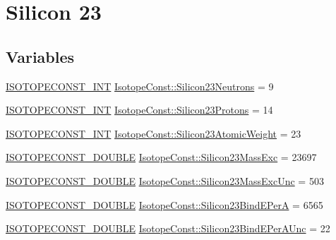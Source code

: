 \hypertarget{group___isotope_const-_silicon-_si23}{}\section{Silicon 23}
\label{group___isotope_const-_silicon-_si23}
\subsection*{Variables}
\begin{DoxyCompactItemize}
\item 
\mbox{\hyperlink{group___isotope_const-_macros_ga5f18360b3e99483a35c32d789e62621c}{I\+S\+O\+T\+O\+P\+E\+C\+O\+N\+S\+T\+\_\+\+I\+NT}} \mbox{\hyperlink{group___isotope_const-_silicon-_si23_ga26b4b927d730735480f5ef62586975b8}{Isotope\+Const\+::\+Silicon23\+Neutrons}} = 9
\item 
\mbox{\hyperlink{group___isotope_const-_macros_ga5f18360b3e99483a35c32d789e62621c}{I\+S\+O\+T\+O\+P\+E\+C\+O\+N\+S\+T\+\_\+\+I\+NT}} \mbox{\hyperlink{group___isotope_const-_silicon-_si23_gaffadb4fe268526d1d59450e08e28ee2a}{Isotope\+Const\+::\+Silicon23\+Protons}} = 14
\item 
\mbox{\hyperlink{group___isotope_const-_macros_ga5f18360b3e99483a35c32d789e62621c}{I\+S\+O\+T\+O\+P\+E\+C\+O\+N\+S\+T\+\_\+\+I\+NT}} \mbox{\hyperlink{group___isotope_const-_silicon-_si23_ga19ae890d696ade27c3ceb5f7e57a2c75}{Isotope\+Const\+::\+Silicon23\+Atomic\+Weight}} = 23
\item 
\mbox{\hyperlink{group___isotope_const-_macros_ga8f45a7272ce02c0b4c65c44636ed719a}{I\+S\+O\+T\+O\+P\+E\+C\+O\+N\+S\+T\+\_\+\+D\+O\+U\+B\+LE}} \mbox{\hyperlink{group___isotope_const-_silicon-_si23_gafc8dd06ffe8739e2287a34025cb80b4b}{Isotope\+Const\+::\+Silicon23\+Mass\+Exc}} = 23697
\item 
\mbox{\hyperlink{group___isotope_const-_macros_ga8f45a7272ce02c0b4c65c44636ed719a}{I\+S\+O\+T\+O\+P\+E\+C\+O\+N\+S\+T\+\_\+\+D\+O\+U\+B\+LE}} \mbox{\hyperlink{group___isotope_const-_silicon-_si23_ga31e4df851291226ec76cec035272f270}{Isotope\+Const\+::\+Silicon23\+Mass\+Exc\+Unc}} = 503
\item 
\mbox{\hyperlink{group___isotope_const-_macros_ga8f45a7272ce02c0b4c65c44636ed719a}{I\+S\+O\+T\+O\+P\+E\+C\+O\+N\+S\+T\+\_\+\+D\+O\+U\+B\+LE}} \mbox{\hyperlink{group___isotope_const-_silicon-_si23_gab7757218b9b42d27113ac911bc12dffc}{Isotope\+Const\+::\+Silicon23\+Bind\+E\+PerA}} = 6565
\item 
\mbox{\hyperlink{group___isotope_const-_macros_ga8f45a7272ce02c0b4c65c44636ed719a}{I\+S\+O\+T\+O\+P\+E\+C\+O\+N\+S\+T\+\_\+\+D\+O\+U\+B\+LE}} \mbox{\hyperlink{group___isotope_const-_silicon-_si23_ga78ee64fe4c8b870d223e4eede603b47d}{Isotope\+Const\+::\+Silicon23\+Bind\+E\+Per\+A\+Unc}} = 22

\end{DoxyCompactItemize}
